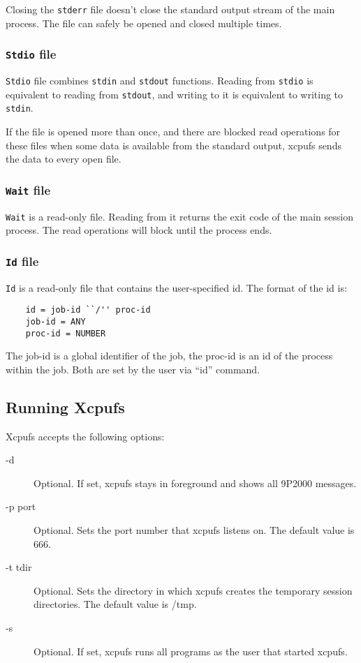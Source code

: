 \documentclass[draft]{article}
\begin{document}
Closing the \verb|stderr| file doesn't close the standard output stream of the
main process. The file can safely be opened and closed multiple times.

\subsubsection{{\tt Stdio} file}

\verb|Stdio| file combines \verb|stdin| and \verb|stdout| functions.
Reading from \verb|stdio| is equivalent to reading from \verb|stdout|, and
writing to it is equivalent to writing to \verb|stdin|.

If the file is opened more than once, and there are blocked read
operations for these files when some data is available from the standard
output, xcpufs sends the data to every open file.

\subsubsection{{\tt Wait} file}

\verb|Wait| is a read-only file. Reading from it returns the exit code of
the main session process. The read operations will block until the process
ends.

\subsubsection{{\tt Id} file}

\verb|Id| is a read-only file that contains the user-specified id. The
format of the id is:

\begin{verbatim}
	id = job-id ``/'' proc-id
	job-id = ANY
	proc-id = NUMBER
\end{verbatim}

The job-id is a global identifier of the job, the proc-id is an id of the
process within the job. Both are set by the user via ``id'' command.

\subsection{Running Xcpufs}

Xcpufs accepts the following options:

\begin{description}

\item [-d] Optional. If set, xcpufs stays in foreground and shows all 9P2000
messages.

\item [-p port] Optional. Sets the port number that xcpufs listens on. The
default value is 666.

\item [-t tdir] Optional. Sets the directory in which xcpufs creates
the temporary session directories. The default value is /tmp.

\item [-s] Optional. If set, xcpufs runs all programs as the user that
started xcpufs.
\end{description}
\end{document}
